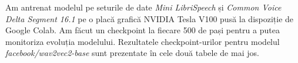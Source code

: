 \par
Am antrenat modelul pe seturile de date \textit{Mini LibriSpeech} și \textit{Common Voice Delta Segment 16.1}
pe o placă grafică NVIDIA Tesla V100 pusă la dispoziție de Google Colab. Am făcut un checkpoint la fiecare
500 de pași pentru a putea monitoriza evoluția modelului. Rezultatele checkpoint-urilor pentru modelul
\textit{facebook/wav2vec2-base} sunt prezentate în cele două tabele de mai jos.



